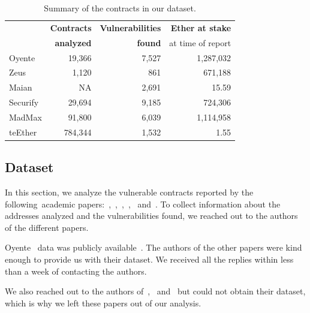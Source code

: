 \begin{table}
	\centering
	\caption{Summary of the contracts in our dataset.}
	\label{fig:dataset-stats}
	\setlength{\tabcolsep}{10pt}
	\begin{tabular}{lrrr}
		\toprule
		\bf \multirow{2}{*}{Name} & \bf Contracts & \bf Vulnerabilities & \bf Ether at stake         \\
		                          & \bf analyzed  & \bf found           & {\small at time of report} \\
		\midrule
		Oyente                    & 19,366        & 7,527               & 1,287,032                  \\
		Zeus                      & 1,120         & 861                 & 671,188                    \\
		Maian                     & NA            & 2,691               & 15.59                      \\
		Securify                  & 29,694        & 9,185               & 724,306                    \\
		MadMax                    & 91,800        & 6,039               & 1,114,958                  \\
		teEther                   & 784,344       & 1,532               & 1.55                       \\
		\bottomrule
	\end{tabular}
\end{table}

\subsection{Dataset}
\label{sec:5a:datasets}
In this section, we analyze the vulnerable contracts reported by the following~\PapersAnalyzed academic papers:~\cite{luu2016a},~\cite{DBLP:conf/ndss/KalraGDS18},~\cite{Nikolic2018a},~\cite{Tsankov2018},~\cite{Grech2018} and~\cite{Krupp2018}. To collect information about the addresses analyzed and the vulnerabilities found, we reached out to the authors of the different papers.

Oyente~\cite{luu2016a} data was publicly available~\cite{oyente-benchmarks}. The authors of the other papers were kind enough to provide us with their dataset. We received all the replies within less than a week of contacting the authors.

We also reached out to the authors of~\cite{Tikhomirov2017},~\cite{Jiang2018} and~\cite{Brent2018} but could not obtain their dataset, which is why we left these papers out of our analysis.

